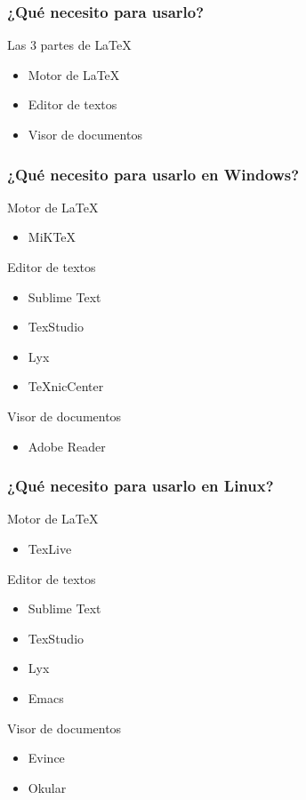 \documentclass[12pt]{beamer}
\begin{document}
\begin{frame}%
  \frametitle{¿Qué necesito para usarlo?}
  \begin{block}{Las 3 partes de \textrm{\LaTeX{}}}
    \begin{itemize}
    \item<2-> Motor de \textrm{\LaTeX{}}
    \item<3-> Editor de textos
    \item<4-> Visor de documentos
    \end{itemize}
  \end{block}
\end{frame}

\begin{frame}%
  \frametitle{¿Qué necesito para usarlo en Windows?}
  \begin{block}{Motor de \textrm{\LaTeX{}}}
    \begin{itemize}
    \item MiKTeX
    \end{itemize}
  \end{block}
  \begin{block}{Editor de textos}
    \begin{itemize}
    \item Sublime Text
    \item TexStudio
    \item Lyx
    \item TeXnicCenter
    \end{itemize}
  \end{block}
  \begin{block}{Visor de documentos}
    \begin{itemize}
    \item Adobe Reader
    \end{itemize}
  \end{block}
\end{frame}

\begin{frame}%
  \frametitle{¿Qué necesito para usarlo en Linux?}
  \begin{block}{Motor de \textrm{\LaTeX{}}}
    \begin{itemize}
    \item TexLive
    \end{itemize}
  \end{block}
  \begin{block}{Editor de textos}
    \begin{itemize}
    \item Sublime Text
    \item TexStudio
    \item Lyx
    \item Emacs
    \end{itemize}
  \end{block}
  \begin{block}{Visor de documentos}
    \begin{itemize}
    \item Evince
    \item Okular
    \end{itemize}
  \end{block}
\end{frame}
\end{document}
